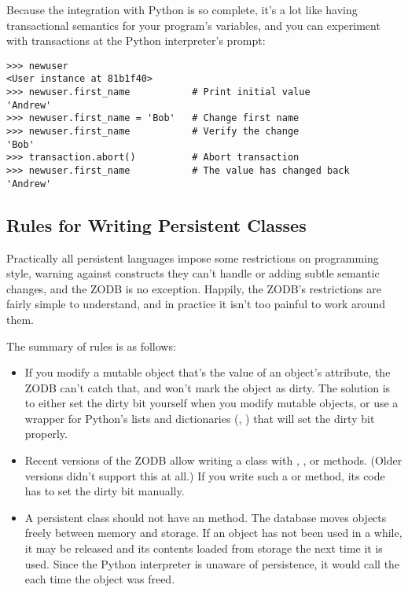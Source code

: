 Because the integration with Python is so complete, it's a lot like
having transactional semantics for your program's variables, and you
can experiment with transactions at the Python interpreter's prompt:

\begin{verbatim}>>> newuser
<User instance at 81b1f40>
>>> newuser.first_name           # Print initial value
'Andrew'         
>>> newuser.first_name = 'Bob'   # Change first name
>>> newuser.first_name           # Verify the change
'Bob'
>>> transaction.abort()          # Abort transaction
>>> newuser.first_name           # The value has changed back
'Andrew'
\end{verbatim}

\subsection{Rules for Writing Persistent Classes}

Practically all persistent languages impose some restrictions on
programming style, warning against constructs they can't handle or
adding subtle semantic changes, and the ZODB is no exception.
Happily, the ZODB's restrictions are fairly simple to understand, and
in practice it isn't too painful to work around them.

The summary of rules is as follows:

\begin{itemize}

\item If you modify a mutable object that's the value of an object's
attribute, the ZODB can't catch that, and won't mark the object as
dirty.  The solution is to either set the dirty bit yourself when you
modify mutable objects, or use a wrapper for Python's lists and
dictionaries (,
)
that will set the dirty bit properly.

\item Recent versions of the ZODB allow writing a class with 
 , , or 
methods.  (Older versions didn't support this at all.)  If you write
such a  or  method, its code
has to set the dirty bit manually.

\item A persistent class should not have an  method.
The database moves objects freely between memory and storage.  If an
object has not been used in a while, it may be released and its
contents loaded from storage the next time it is used.  Since the
Python interpreter is unaware of persistence, it would call the
 each time the object was freed.

\end{itemize}


